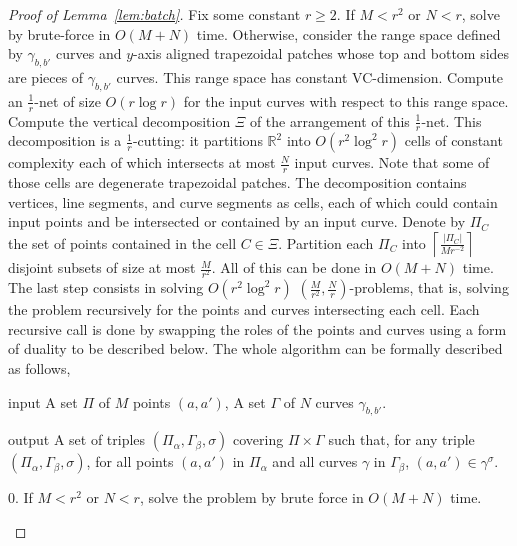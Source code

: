 \begin{proof}[Proof of Lemma~\ref{lem:batch}]
Fix some constant $r \geq 2$.
If $M < r^2$ or $N < r$, solve by brute-force in $O(M+N)$ time. Otherwise,
consider the range space defined by $\gamma_{b,b'}$ curves and $y$-axis aligned
trapezoidal patches whose top and bottom sides are pieces of $\gamma_{b,b'}$
curves. This range space has constant VC-dimension.
Compute an $\frac 1r$-net of size $O(r \log r)$ for the input curves with respect to
this range space. Compute the vertical decomposition \(\Xi\) of the arrangement
of this $\frac 1r$-net. This decomposition is a $\frac 1r$-cutting: it partitions
$\mathbb{R}^2$ into $O(r^2 \log^2 r)$ cells of constant complexity each of
which intersects at most \(\frac{N}{r}\) input curves.
Note that some of those cells are degenerate trapezoidal
patches. The decomposition contains vertices, line segments, and curve
segments as cells, each of which could contain input points and be intersected
or contained by an input curve.
Denote by \(\Pi_C\) the set of points contained in the cell \(C \in \Xi\).
Partition each \(\Pi_C\) into \(\left\lceil \frac{\lvert \Pi_C \rvert}{M
r^{-2}} \right\rceil\) disjoint subsets of size at most \(\frac{M}{r^2}\). All
of this can be done in \(O(M+N)\) time.
The last step consists in solving \(O(r^2 \log^2 r)\)
\((\frac{M}{r^2},\frac{N}{r})\)-problems, that is, solving the problem
recursively for the points and curves intersecting each cell.
Each recursive call is done by swapping the roles of the points and curves
using a form of duality to be described below.
The whole algorithm can be formally described as follows,
\begin{algorithm}\label{algo:pbrs}
\item[input] A set $\Pi$ of $M$ points $(a,a')$, A set $\Gamma$ of $N$ curves $\gamma_{b,b'}$.
\item[output] A set of triples $(\Pi_\alpha,\Gamma_\beta,\sigma)$ covering $\Pi \times \Gamma$
    such that, for any triple\\
    $(\Pi_\alpha,\Gamma_\beta,\sigma)$,
    for all points $(a,a')$ in $\Pi_\alpha$ and all curves $\gamma$ in
    $\Gamma_\beta$,
    $(a,a') \in \gamma^\sigma$.
\item[0.] If $M < r^2$ or $N < r$, solve the problem by brute force in $O(M+N)$ time.

\end{algorithm}
\end{proof}
